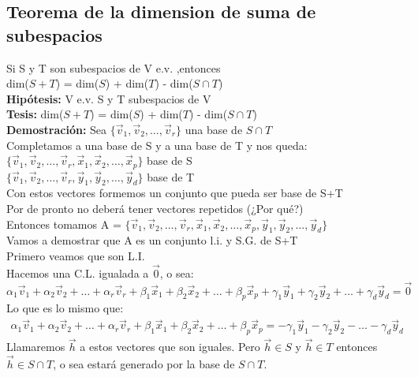 \documentclass[11pt]{article}
\begin{document}
\subsection{Teorema de la dimension de suma de subespacios}
Si S y T son subespacios de V e.v. ,entonces\\
dim($S+T$) = dim($S$) + dim($T$) - dim($S \cap T$)\\
{\bfseries {Hipótesis:}} V e.v. S y T subespacios de V  \\
{\bfseries {Tesis:}} dim($S+T$) = dim($S$) + dim($T$) - dim($S \cap T$)\\
{\bfseries {Demostración:}} Sea $\{\vec{v}_1, \vec{v}_2, \hdots, \vec{v}_r\}$ una base de $S \cap T$\\
Completamos a una base de S y a una base de T y nos queda: \\
$\{\vec{v}_1, \vec{v}_2, \hdots, \vec{v}_r, \vec{x}_1, \vec{x}_2, \hdots, \vec{x}_p\}$ base de S \\
$\{\vec{v}_1, \vec{v}_2, \hdots, \vec{v}_r, \vec{y}_1, \vec{y}_2, \hdots, \vec{y}_d\}$ base de T \\
Con estos vectores formemos un conjunto que pueda ser base de S+T\\
Por de pronto no deberá tener vectores repetidos (¿Por qué?)\\
Entonces tomamos A = $\{\vec{v}_1, \vec{v}_2, \hdots, \vec{v}_r, \vec{x}_1, \vec{x}_2, \hdots, \vec{x}_p, \vec{y}_1, \vec{y}_2, \hdots, \vec{y}_d\}$\\
Vamos a demostrar que A es un conjunto l.i. y S.G. de S+T\\
Primero veamos que son L.I.\\
Hacemos una C.L. igualada a $\vec{0}$, o sea: \\
$\alpha_1\vec{v}_1 + \alpha_2\vec{v}_2 + \hdots + \alpha_r\vec{v}_r + \beta_1\vec{x}_1 + \beta_2\vec{x}_2 + \hdots + \beta_p\vec{x}_p + \gamma_1\vec{y}_1 + \gamma_2\vec{y}_2 + \hdots + \gamma_d\vec{y}_d = \vec{0}$\\
Lo que es lo mismo que: 
\begin{align}
\alpha_1\vec{v}_1 + \alpha_2\vec{v}_2 + \hdots + \alpha_r\vec{v}_r + \beta_1\vec{x}_1 + \beta_2\vec{x}_2 + \hdots + \beta_p\vec{x}_p  = - \gamma_1\vec{y}_1 - \gamma_2\vec{y}_2 - \hdots - \gamma_d\vec{y}_d
\end{align}
Llamaremos $\vec{h}$ a estos vectores que son iguales. Pero $\vec{h} \in S$ y $\vec{h} \in T$ entonces $\vec{h} \in S \cap T$, o sea estará generado por la base de $S \cap T$. \\
\end{document}
